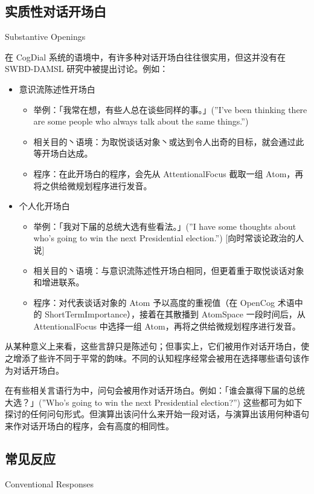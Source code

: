 \subsection{实质性对话开场白}{Substantive Openings}

在 CogDial 系统的语境中，有许多种对话开场白往往很实用，但这并没有在 SWBD-DAMSL 研究中被提出讨论。例如：

\begin{itemize}
\item 意识流陈述性开场白
\begin{itemize}
\item 举例：「我常在想，有些人总在谈些同样的事。」(”I’ve been thinking there are some people who always talk about the same things.”)
\item 相关目的丶语境：为取悦谈话对象丶或达到令人出奇的目标，就会通过此等开场白达成。
\item 程序：在此开场白的程序，会先从 AttentionalFocus 截取一组 Atom，再将之供给微规划程序进行发音。
\end{itemize}
\item 个人化开场白
\begin{itemize}
\item 举例：「我对下届的总统大选有些看法。」(”I have some thoughts about who’s going to win the next Presidential election.”) [向时常谈论政治的人说]
\item 相关目的丶语境：与意识流陈述性开场白相同，但更着重于取悦谈话对象和增进联系。 
\item 程序：对代表谈话对象的 Atom 予以高度的重视值（在 OpenCog 术语中的 ShortTermImportance），接着在其散播到 AtomSpace 一段时间后，从 AttentionalFocus 中选择一组 Atom，再将之供给微规划程序进行发音。
\end{itemize}
\end{itemize}

从某种意义上来看，这些言辞只是陈述句；但事实上，它们被用作对话开场白，使之增添了些许不同于平常的韵味。不同的认知程序经常会被用在选择哪些语句该作为对话开场白。 

在有些相关言语行为中，问句会被用作对话开场白。例如：「谁会赢得下届的总统大选？」(”Who’s going to win the next Presidential election?”) 这些都可为如下探讨的任何问句形式。但演算出该问什么来开始一段对话，与演算出该用何种语句来作对话开场白的程序，会有高度的相同性。

\subsection{常见反应}{Conventional Responses}

